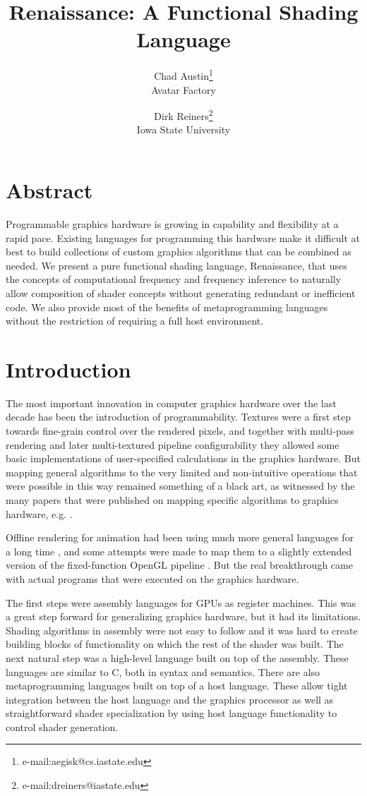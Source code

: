 \documentclass{acmsiggraph}               %
\title{Renaissance: A Functional Shading Language}
\author{Chad Austin\thanks{e-mail:aegisk@cs.iastate.edu}\\ Avatar Factory %
\and Dirk Reiners\thanks{e-mail:dreiners@iastate.edu}\\ Iowa State University}
\begin{document}
\maketitle

\section{Abstract}

Programmable graphics hardware is growing in capability and
flexibility at a rapid pace.  Existing languages for programming this
hardware make it difficult at best to build collections of custom
graphics algorithms that can be combined as needed.  We present a pure
functional shading language, Renaissance, that uses the concepts of
computational frequency and frequency inference to naturally allow
composition of shader concepts without generating redundant or
inefficient code.  We also provide most of the benefits of
metaprogramming languages without the restriction of requiring a full
host environment.

\section{Introduction}

The most important innovation in computer graphics hardware over the last 
decade has been the introduction of programmability. Textures were a first
step  towards fine-grain control over the rendered pixels, and together with
multi-pass  rendering and later multi-textured pipeline configurability they
allowed some  basic implementations of user-specified calculations in the
graphics hardware. But mapping general algorithms to the very limited
and non-intuitive  operations that were possible in this way remained
something of a black art, as  witnessed by the many papers that were
published on mapping specific algorithms to graphics hardware, e.g. 
\cite{heidrich01Shading,kautztowards}. 

Offline rendering for animation had been using much more general languages
for a long time \cite{HanrahanRenderman}, and some attempts were made to map 
them to a slightly extended version of the fixed-function OpenGL pipeline 
\cite{peercy00interactive}. But the real breakthrough came with actual
programs that were executed on the graphics hardware. 

The first steps were assembly languages for GPUs as register machines.
This was a great step forward for generalizing graphics hardware, but
it had its limitations.  Shading algorithms in assembly were not easy
to follow and it was hard to create building blocks of functionality
on which the rest of the shader was built.  The next natural step was
a high-level language built on top of the assembly.  These languages
are similar to C, both in syntax and semantics.  There are also
metaprogramming languages built on top of a host language.  These
allow tight integration between the host language and the graphics
processor as well as straightforward shader specialization by using
host language functionality to control shader generation.
\end{document}
